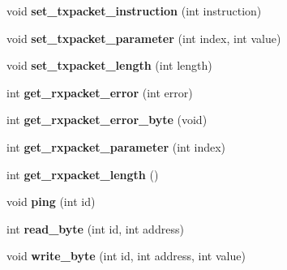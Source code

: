 \begin{DoxyCompactItemize}
\item 
\hypertarget{classdynamixel_a209a43f983f214323b6f0a627d5e8c13}{}void {\bfseries set\+\_\+txpacket\+\_\+instruction} (int instruction)\label{classdynamixel_a209a43f983f214323b6f0a627d5e8c13}

\item 
\hypertarget{classdynamixel_a2c3d31bbbed70a69918e9972a620384b}{}void {\bfseries set\+\_\+txpacket\+\_\+parameter} (int index, int value)\label{classdynamixel_a2c3d31bbbed70a69918e9972a620384b}

\item 
\hypertarget{classdynamixel_a829278f48e21c810b172eb8cab3b86de}{}void {\bfseries set\+\_\+txpacket\+\_\+length} (int length)\label{classdynamixel_a829278f48e21c810b172eb8cab3b86de}

\item 
\hypertarget{classdynamixel_a1bbabb82d7a2764cc4b0b351dd0019e5}{}int {\bfseries get\+\_\+rxpacket\+\_\+error} (int error)\label{classdynamixel_a1bbabb82d7a2764cc4b0b351dd0019e5}

\item 
\hypertarget{classdynamixel_a6e62341ef9f51b6e152e769bd7be9d75}{}int {\bfseries get\+\_\+rxpacket\+\_\+error\+\_\+byte} (void)\label{classdynamixel_a6e62341ef9f51b6e152e769bd7be9d75}

\item 
\hypertarget{classdynamixel_a68b5fa99719a9aec0734ecfb0635503b}{}int {\bfseries get\+\_\+rxpacket\+\_\+parameter} (int index)\label{classdynamixel_a68b5fa99719a9aec0734ecfb0635503b}

\item 
\hypertarget{classdynamixel_ae9cc18fdeda8329f68fa0f2f0a7a9aba}{}int {\bfseries get\+\_\+rxpacket\+\_\+length} ()\label{classdynamixel_ae9cc18fdeda8329f68fa0f2f0a7a9aba}

\item 
\hypertarget{classdynamixel_af2bd714423e7c4fc089762805c0c71f3}{}void {\bfseries ping} (int id)\label{classdynamixel_af2bd714423e7c4fc089762805c0c71f3}

\item 
\hypertarget{classdynamixel_a888404b41c4c4395a0b745c77ff2cea9}{}int {\bfseries read\+\_\+byte} (int id, int address)\label{classdynamixel_a888404b41c4c4395a0b745c77ff2cea9}

\item 
\hypertarget{classdynamixel_a66c1e32cc45dd46d329f1fc212e46a3d}{}void {\bfseries write\+\_\+byte} (int id, int address, int value)\label{classdynamixel_a66c1e32cc45dd46d329f1fc212e46a3d}


\end{DoxyCompactItemize}
